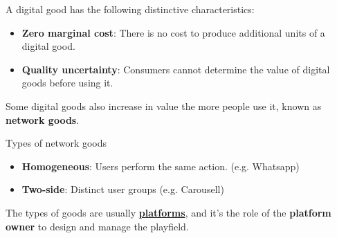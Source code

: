 A digital good has the following distinctive characteristics:

\begin{itemize}
    \item \textbf{Zero marginal cost}: There is no cost to produce additional units of a digital good.
    \item \textbf{Quality uncertainty}: Consumers cannot determine the value of digital goods before using it.
\end{itemize}

Some digital goods also increase in value the more people use it, known as \textbf{network goods}.

\begin{definition}
    {Types of network goods}
    \begin{itemize}
        \item \textbf{Homogeneous}: Users perform the same action. (e.g. Whatsapp)
        \item \textbf{Two-side}: Distinct user groups (e.g. Carousell)
    \end{itemize}
    The types of goods are usually \hyperref[subsec:platform]{\textbf{platforms}}, and it's the role of the \textbf{platform owner} to design and manage the playfield.
\end{definition}

\label{def:network}